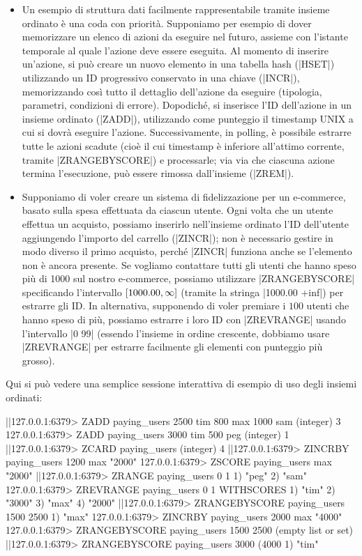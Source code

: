 \begin{itemize}
	\item Un esempio di struttura dati facilmente rappresentabile tramite insieme ordinato è una
	coda con priorità. Supponiamo per esempio di dover memorizzare un elenco di azioni da eseguire
	nel futuro, assieme con l'istante temporale al quale l'azione deve essere eseguita. Al momento
	di inserire un'azione, si può creare un nuovo elemento in una tabella hash (\cverb|HSET|)
	utilizzando un ID progressivo conservato in una chiave (\cverb|INCR|), memorizzando così tutto
	il dettaglio dell'azione da eseguire (tipologia, parametri, condizioni di errore). Dopodiché,
	si inserisce l'ID dell'azione in un insieme ordinato (\cverb|ZADD|), utilizzando come punteggio
	il timestamp UNIX a cui si dovrà eseguire l'azione. Successivamente, in polling, è possibile
	estrarre tutte le azioni scadute (cioè il cui timestamp è inferiore all'attimo corrente,
	tramite \cverb|ZRANGEBYSCORE|) e processarle; via via che ciascuna azione termina l'esecuzione,
	può essere rimossa dall'insieme (\cverb|ZREM|).

	\item Supponiamo di voler creare un sistema di fidelizzazione per un e-commerce, basato sulla
	spesa effettuata da ciascun utente. Ogni volta che un utente effettua un acquisto, possiamo
	inserirlo nell'insieme ordinato l'ID dell'utente aggiungendo l'importo del carrello
	(\cverb|ZINCR|); non è necessario gestire in modo diverso il primo acquisto, perché \cverb|ZINCR|
	funziona anche se l'elemento non è ancora presente. Se vogliamo contattare tutti gli utenti che
	hanno speso più di \SI{1000}{\EUR} sul nostro e-commerce, possiamo utilizzare
	\cverb|ZRANGEBYSCORE| specificando l'intervallo $\interval{1000.00}{\infty}$ (tramite la stringa
	\cverb|1000.00 +inf|) per estrarre gli ID. In alternativa, supponendo di voler premiare i
	$100$ utenti che hanno speso di più, possiamo estrarre i loro ID con \cverb|ZREVRANGE| usando
	l'intervallo \cverb|0 99| (essendo l'insieme in ordine crescente, dobbiamo usare
	\cverb|ZREVRANGE| per estrarre facilmente gli elementi con punteggio più grosso).
\end{itemize}

Qui si può vedere una semplice sessione interattiva di esempio di uso degli insiemi ordinati:

\begin{commentedsource}[style=redis]
|\lnote|127.0.0.1:6379> ZADD paying_users 2500 tim 800 max 1000 sam 
(integer) 3
127.0.0.1:6379> ZADD paying_users 3000 tim 500 peg
(integer) 1
|\lnote|127.0.0.1:6379> ZCARD paying_users
(integer) 4
|\lnote|127.0.0.1:6379> ZINCRBY paying_users 1200 max
"2000"
127.0.0.1:6379> ZSCORE paying_users max
"2000"
|\lnote|127.0.0.1:6379> ZRANGE paying_users 0 1
1) "peg"
2) "sam"
127.0.0.1:6379> ZREVRANGE paying_users 0 1 WITHSCORES
1) "tim"
2) "3000"
3) "max"
4) "2000"
|\lnote|127.0.0.1:6379> ZRANGEBYSCORE paying_users 1500 2500
1) "max"
127.0.0.1:6379> ZINCRBY paying_users 2000 max
"4000"
127.0.0.1:6379> ZRANGEBYSCORE paying_users 1500 2500
(empty list or set)
|\lnote|127.0.0.1:6379> ZRANGEBYSCORE paying_users 3000 (4000
1) "tim"
\end{commentedsource}

